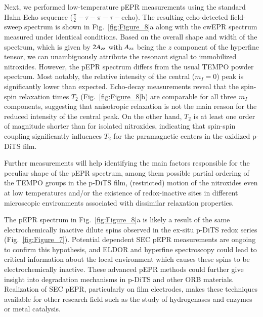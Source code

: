 Next, we performed low-temperature pEPR measurements using the standard Hahn Echo sequence ($\frac{\pi}{2} - \tau - \pi - \tau - \textrm{echo}$). The resulting echo-detected field-sweep spectrum is shown in Fig.~\ref{fig:Figure_8}a along with the cwEPR spectrum measured under identical conditions. Based on the overall shape and width of the spectrum, which is given by $2A\textsubscript{zz}$ with $A\textsubscript{zz}$ being the $z$ component of the hyperfine tensor, we can unambiguously attribute the resonant signal to immobilized nitroxides. However, the pEPR spectrum differs from the usual TEMPO powder spectrum. Most notably, the relative intensity of the central ($m_I=0$) peak is significantly lower than expected. Echo-decay measurements reveal that the spin-spin relaxation times $T_2$ (Fig.~\ref{fig:Figure_8}b) are comparable for all three $m_I$ components, suggesting that anisotropic relaxation is not the main reason for the reduced intensity of the central peak. On the other hand, $T_2$ is at least one order of magnitude shorter than for isolated nitroxides, indicating that spin-spin coupling significantly influences $T_2$ for the paramagnetic centers in the oxidized p-DiTS film.

\par
Further measurements will help identifying the main factors responsible for the peculiar shape of the pEPR spectrum, among them possible partial ordering of the TEMPO groups in the p-DiTS film, (restricted) motion of the nitroxides even at low temperatures and/or the existence of redox-inactive sites in different microscopic environments associated with dissimilar relaxation properties. 
%
\par
The pEPR spectrum in Fig.~\ref{fig:Figure_8}a is likely a result of the same electrochemically inactive dilute spins observed in the ex-situ p-DiTS redox series (Fig.~\ref{fig:Figure_7}). Potential dependent SEC pEPR measurements are ongoing to confirm this hypothesis, and ELDOR and hyperfine spectroscopy could lead to critical information about the local environment which causes these spins to be electrochemically inactive. These advanced pEPR methods could further give insight into degradation mechanisms in p-DiTS and other ORB materials. Realization of SEC pEPR, particularly on film electrodes, makes these techniques available for other research field such as the study of hydrogenases and enzymes or metal catalysis.


